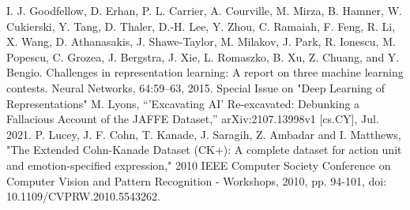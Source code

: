 \documentclass[conference]{IEEEtran}
\begin{document}
\begin{thebibliography}{00}


      I. J. Goodfellow, D. Erhan, P. L. Carrier, A. Courville, M. Mirza, B. Hamner, W. Cukierski, Y. Tang, D. Thaler, D.-H. Lee, Y. Zhou, C. Ramaiah, F. Feng, R. Li, X. Wang, D. Athanasakis, J. Shawe-Taylor, M. Milakov, J. Park, R. Ionescu, M. Popescu, C. Grozea, J. Bergstra, J. Xie, L. Romaszko, B. Xu, Z. Chuang, and Y. Bengio. Challenges in representation learning: A report on three machine learning contests. Neural Networks, 64:59--63, 2015. Special Issue on "Deep Learning of Representations"
    	M. Lyons, “'Excavating AI' Re-excavated: Debunking a Fallacious Account of the JAFFE Dataset,” arXiv:2107.13998v1 [cs.CY], Jul. 2021.
    	P. Lucey, J. F. Cohn, T. Kanade, J. Saragih, Z. Ambadar and I. Matthews, "The Extended Cohn-Kanade Dataset (CK+): A complete dataset for action unit and emotion-specified expression," 2010 IEEE Computer Society Conference on Computer Vision and Pattern Recognition - Workshops, 2010, pp. 94-101, doi: 10.1109/CVPRW.2010.5543262.


\end{thebibliography}
\end{document}
